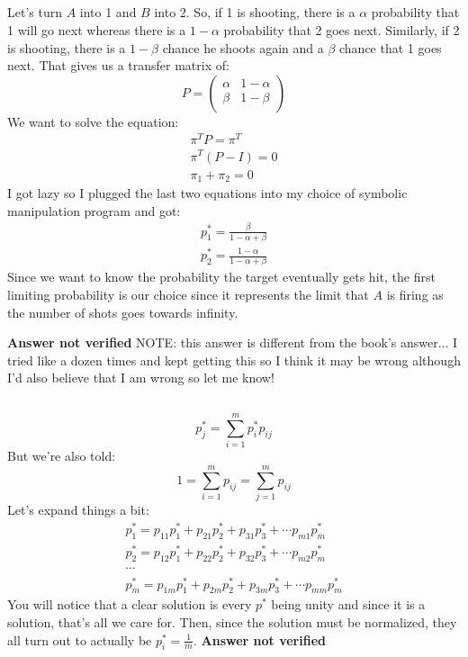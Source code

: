 \subsection{}
Let's turn $A$ into 1 and $B$ into 2.  So, if 1 is shooting, there is a $\alpha$ probability that 1 will go next whereas there is a $1 - \alpha$ probability that 2 goes next.  Similarly, if 2 is shooting, there is a $1 - \beta$ chance he shoots again and a $\beta$ chance that 1 goes next.  That gives us a transfer matrix of:
\begin{equation}
P = \left(
\begin{array}{cc}
 \alpha  & 1-\alpha  \\
 \beta  & 1 - \beta  \\
\end{array}
\right)
\end{equation}
We want to solve the equation:
\begin{eqnarray}
	\pi^T P = \pi^T \\
	\pi^T (P - I) = 0 \\
	\pi_1 +\pi_2 = 0
\end{eqnarray}
I got lazy so I plugged the last two equations into my choice of symbolic manipulation program and got:
\begin{eqnarray}
	p_1^* = \frac{\beta }{1 - \alpha +\beta} \\
	p_2^* = \frac{1 - \alpha }{1 - \alpha +\beta}
\end{eqnarray}
Since we want to know the probability the target eventually gets hit, the first limiting probability is our choice since it  represents the limit that $A$ is firing as the number of shots goes towards infinity. 

\textbf{Answer not verified}
NOTE: this answer is different from the book's answer... I tried like a dozen times and kept getting this so I think it may be wrong although I'd also believe that I am wrong so let me know!


\subsection{}

\begin{equation}
	p_j^* = \sum_{i=1}^{m} p_i^* p_{ij}
\end{equation}
But we're also told:
\begin{equation}
	1 = \sum_{i=1}^{m} p_{ij} = \sum_{j=1}^{m} p_{ij}
\end{equation}
Let's expand things a bit:
\begin{eqnarray}
	p^*_1 = p_{11}p^*_1 + p_{21}p^*_2 + p_{31}p^*_3 + \cdots	p_{m1}p^*_m \\
	p^*_2 = p_{12}p^*_1 + p_{22}p^*_2 + p_{32}p^*_3 + \cdots	p_{m2}p^*_m \\
	\cdots \\
	p^*_m = p_{1m}p^*_1 + p_{2m}p^*_2 + p_{3m}p^*_3 + \cdots	p_{mm}p^*_m
\end{eqnarray}
You will notice that a clear solution is every $p^*$ being unity and since it is a solution, that's all we care for.  Then, since the solution must be normalized, they all turn out to actually be $p^*_i = \frac{1}{m}$.
\textbf{Answer not verified}


